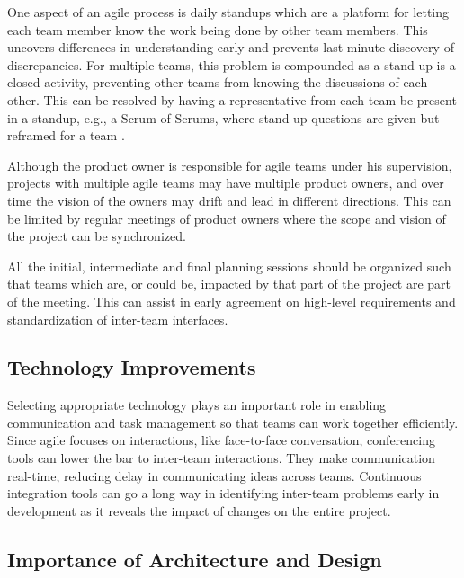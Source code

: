 One aspect of an agile process is daily standups which are a platform for letting each team member know the work being done by other team members. %
This uncovers differences in understanding early and prevents last minute discovery of discrepancies.
For multiple teams, this problem is compounded as a stand up is a closed activity, preventing other teams from knowing the discussions of each other.
This can be resolved by having a representative from each team be present in a standup, e.g., a Scrum of Scrums, where stand up questions are given but reframed for a team \cite{Rubin12}.

Although the product owner is responsible for agile teams under his supervision, projects with multiple agile teams may have multiple product owners, and over time the vision of the owners may drift and lead in different directions.
This can be limited by regular meetings of product owners where the scope and vision of the project can be synchronized.


All the initial, intermediate and final planning sessions should be organized such that teams which are, or could be, impacted by that part of the project are part of the meeting.
This can assist in early agreement on high-level requirements and standardization of inter-team interfaces.

\subsection{Technology Improvements} \label{sec:tech_impv}
Selecting appropriate technology plays an important role in enabling communication and task management so that teams can work together efficiently.
%
Since agile focuses on interactions, like face-to-face conversation, conferencing tools can lower the bar to inter-team interactions.
They make communication real-time, reducing delay in communicating ideas across teams.
Continuous integration tools can go a long way in identifying inter-team problems early in development as it reveals the impact of changes on the entire project.


\subsection{Importance of Architecture and Design}\label{sec:imp_of_dsgn}

